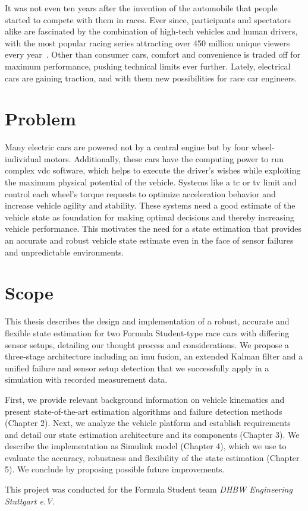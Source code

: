 It was not even ten years after the invention of the automobile that people started to compete with them in races. Ever since, participants and spectators alike are fascinated by the combination of high-tech vehicles and human drivers, with the most popular racing series attracting over 450 million unique viewers every year~\cite{FormulaOneWorldChampionshipLimited.2020}. Other than consumer cars, comfort and convenience is traded off for maximum performance, pushing technical limits ever further. Lately, electrical cars are gaining traction, and with them new possibilities for race car engineers.

\section{Problem}
Many electric cars are powered not by a central engine but by four wheel-individual motors. Additionally, these cars have the computing power to run complex \glsdesc{vdc} software, which helps to execute the driver's wishes while exploiting the maximum physical potential of the vehicle. Systems like a \glsdesc{tc} or \glsdesc{tv} limit and control each wheel's torque requests to optimize acceleration behavior and increase vehicle agility and stability. These systems need a good estimate of the vehicle state as foundation for making optimal decisions and thereby increasing vehicle performance. This motivates the need for a state estimation that provides an accurate and robust vehicle state estimate even in the face of sensor failures and unpredictable environments.

\section{Scope}
This thesis describes the design and implementation of a robust, accurate and flexible state estimation for two Formula Student-type race cars with differing sensor setups, detailing our thought process and considerations. We propose a three-stage architecture including an \glsdesc{imu} fusion, an extended Kalman filter and a unified failure and sensor setup detection that we successfully apply in a simulation with recorded measurement data.

First, we provide relevant background information on vehicle kinematics and present state-of-the-art estimation algorithms and failure detection methods (Chapter 2). Next, we analyze the vehicle platform and establish requirements and detail our state estimation architecture and its components (Chapter 3). We describe the implementation as Simulink model (Chapter 4), which we use to evaluate the accuracy, robustness and flexibility of the state estimation (Chapter 5). We conclude by proposing possible future improvements.

This project was conducted for the Formula Student team \textit{DHBW Engineering Stuttgart e.V.}
